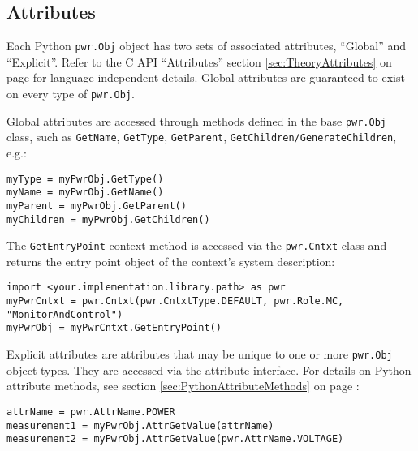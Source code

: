 \documentclass[12pt]{report} %
\begin{document}
\begin{appendices}
\subsection{Attributes}\label{sec:PythonAttributes}

Each Python \texttt{pwr.Obj} object has two sets of associated attributes,
``Global'' and ``Explicit''. Refer to the C API ``Attributes'' section
\ref{sec:TheoryAttributes} on page \pageref{sec:TheoryAttributes} for language
independent details. Global attributes are guaranteed to exist on every type of
\texttt{pwr.Obj}.

Global attributes are accessed through methods defined in the base
\texttt{pwr.Obj} class, such as \texttt{GetName}, \texttt{GetType},
\texttt{GetParent}, \texttt{GetChildren/GenerateChildren}, e.g.:

\begin{center}\begin{minipage}{.95\linewidth}\begin{lstlisting}
myType = myPwrObj.GetType()
myName = myPwrObj.GetName()
myParent = myPwrObj.GetParent()
myChildren = myPwrObj.GetChildren()
\end{lstlisting}\end{minipage}\end{center}

The \texttt{GetEntryPoint} context method is accessed via the
\texttt{pwr.Cntxt} class and returns the entry point object of the context's
system description:

\begin{center}\begin{minipage}{.95\linewidth}\begin{lstlisting}
import <your.implementation.library.path> as pwr
myPwrCntxt = pwr.Cntxt(pwr.CntxtType.DEFAULT, pwr.Role.MC, "MonitorAndControl")
myPwrObj = myPwrCntxt.GetEntryPoint()
\end{lstlisting}\end{minipage}\end{center}

Explicit attributes are attributes that may be unique to one or more
\texttt{pwr.Obj} object types. They are accessed via the attribute interface.
For details on Python attribute methods, see section
\ref{sec:PythonAttributeMethods} on page \pageref{sec:PythonAttributeMethods}:

\begin{center}\begin{minipage}{.95\linewidth}\begin{lstlisting}
attrName = pwr.AttrName.POWER
measurement1 = myPwrObj.AttrGetValue(attrName)
measurement2 = myPwrObj.AttrGetValue(pwr.AttrName.VOLTAGE)
\end{lstlisting}\end{minipage}\end{center}


\end{appendices}
\end{document}
